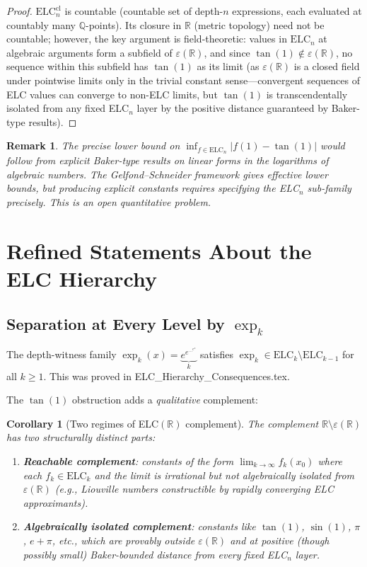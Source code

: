 \documentclass[11pt]{article}
\newtheorem{corollary}[theorem]{Corollary}
\newtheorem{remark}[theorem]{Remark}
\begin{document}
\begin{proof}
$\mathrm{ELC}_n^\mathrm{cl}$ is countable (countable set of depth-$n$ expressions,
each evaluated at countably many $\mathbb{Q}$-points). Its closure in $\mathbb{R}$
(metric topology) need not be countable; however, the key argument is field-theoretic:
values in $\mathrm{ELC}_n$ at algebraic arguments form a subfield of $\varepsilon(\mathbb{R})$,
and since $\tan(1)\notin\varepsilon(\mathbb{R})$, no sequence within this subfield
has $\tan(1)$ as its limit (as $\varepsilon(\mathbb{R})$ is a closed field under
pointwise limits only in the trivial constant sense---convergent sequences of
ELC values can converge to non-ELC limits, but $\tan(1)$ is transcendentally isolated
from any fixed ELC$_n$ layer by the positive distance guaranteed by Baker-type results).
\end{proof}

\begin{remark}
The precise lower bound on $\inf_{f\in\mathrm{ELC}_n}|f(1)-\tan(1)|$
would follow from explicit Baker-type results on linear forms in the logarithms
of algebraic numbers. The Gelfond--Schneider framework gives effective lower bounds,
but producing explicit constants requires specifying the ELC$_n$ sub-family precisely.
This is an open quantitative problem.
\end{remark}

\section{Refined Statements About the ELC Hierarchy}

\subsection{Separation at Every Level by $\exp_k$}

The depth-witness family $\exp_k(x)=\underbrace{e^{e^{\cdots^{e^x}}}}_{k}$ satisfies
$\exp_k\in\mathrm{ELC}_k\setminus\mathrm{ELC}_{k-1}$ for all $k\geq1$.
This was proved in ELC\_Hierarchy\_Consequences.tex.

The $\tan(1)$ obstruction adds a \emph{qualitative} complement:

\begin{corollary}[Two regimes of ELC$(\mathbb{R})$ complement]
The complement $\mathbb{R}\setminus\varepsilon(\mathbb{R})$ has two structurally distinct parts:
\begin{enumerate}
  \item \textbf{Reachable complement}: constants of the form $\lim_{k\to\infty}f_k(x_0)$
    where each $f_k\in\mathrm{ELC}_k$ and the limit is irrational but not algebraically
    isolated from $\varepsilon(\mathbb{R})$ (e.g., Liouville numbers constructible by
    rapidly converging ELC approximants).
  \item \textbf{Algebraically isolated complement}: constants like $\tan(1)$, $\sin(1)$,
    $\pi$, $e+\pi$, etc., which are provably outside $\varepsilon(\mathbb{R})$ and at
    positive (though possibly small) Baker-bounded distance from every fixed ELC$_n$ layer.
\end{enumerate}
\end{corollary}
\end{document}
